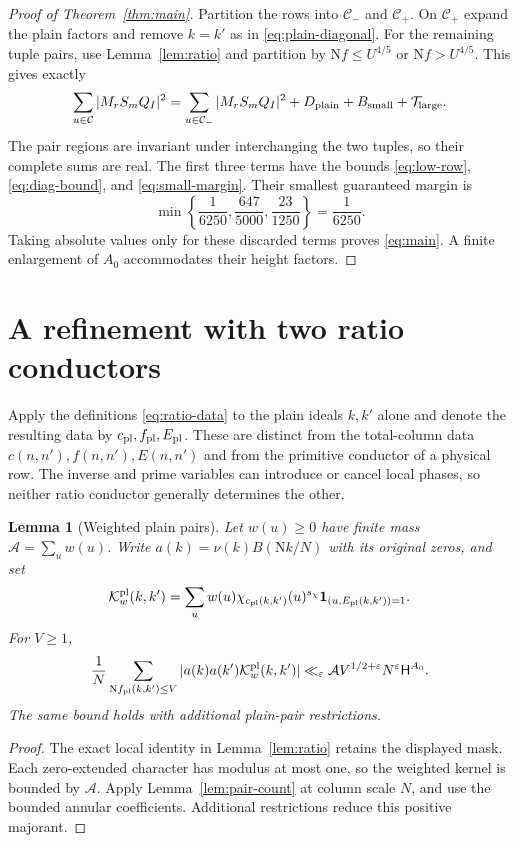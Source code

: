 \documentclass[11pt]{article}
\newtheorem{lemma}[theorem]{Lemma}
\theoremstyle{definition}
\theoremstyle{remark}
\numberwithin{equation}{section}
\newcommand{\Nm}{\mathrm N}
\newcommand{\CC}{\mathcal C}
\newcommand{\HH}{\mathsf H}
\newcommand{\ind}{\mathbf1}
\newcommand{\ee}{\varepsilon}
\newcommand{\Tlarge}{\mathcal T_{\mathrm{large}}}
\begin{document}
\begin{proof}[Proof of Theorem~\ref{thm:main}]
Partition the rows into $\CC_-$ and $\CC_+$. On $\CC_+$ expand the
plain factors and remove $k=k'$ as in \eqref{eq:plain-diagonal}.
For the remaining tuple pairs, use Lemma~\ref{lem:ratio} and partition
by $\Nm f\le U^{4/5}$ or $\Nm f>U^{4/5}$. This gives exactly
\[
\sum_{u\in\CC}|M_rS_mQ_I|^2
=\sum_{u\in\CC_-}|M_rS_mQ_I|^2
+D_{\rm plain}+B_{\rm small}+\Tlarge.
\]
The pair regions are invariant under interchanging the two tuples,
so their complete sums are real. The first three terms have the
bounds \eqref{eq:low-row}, \eqref{eq:diag-bound}, and
\eqref{eq:small-margin}. Their smallest guaranteed margin is
\[
\min\left\{\frac1{6250},\frac{647}{5000},\frac{23}{1250}\right\}
=\frac1{6250}.
\]
Taking absolute values only for these discarded terms proves
\eqref{eq:main}. A finite enlargement of $A_0$ accommodates their
height factors.
\end{proof}

\section{A refinement with two ratio conductors}\label{sec:two-ratios}

Apply the definitions \eqref{eq:ratio-data} to the plain ideals $k,k'$
alone and denote the resulting data by
$c_{\rm pl},f_{\rm pl},E_{\rm pl}$. These are distinct from the
total-column data $c(n,n'),f(n,n'),E(n,n')$ and from the primitive
conductor of a physical row. The inverse and prime variables can
introduce or cancel local phases, so neither ratio conductor generally
determines the other.

\begin{lemma}[Weighted plain pairs]\label{lem:weighted-plain}
Let $w(u)\ge0$ have finite mass $\mathcal A=\sum_u w(u)$.
Write $a(k)=\nu(k)B(\Nm k/N)$ with its original zeros, and set
\[
\mathcal K_w^{\rm pl}(k,k')=
 \sum_u w(u)\chi_{c_{\rm pl}(k,k')}(u)^{s_\chi}
 \ind_{(u,E_{\rm pl}(k,k'))=1}.
\]
For $V\ge1$,
\begin{equation}\label{eq:weighted-plain}
\frac1N\sum_{\Nm f_{\rm pl}(k,k')\le V}
 |a(k)a(k')\mathcal K_w^{\rm pl}(k,k')|
\ll_\ee \mathcal A V^{1/2+\ee}N^\ee\HH^{A_0}.
\end{equation}
The same bound holds with additional plain-pair restrictions.
\end{lemma}
\begin{proof}
The exact local identity in Lemma~\ref{lem:ratio} retains the displayed
mask. Each zero-extended character has modulus at most one, so the
weighted kernel is bounded by $\mathcal A$. Apply
Lemma~\ref{lem:pair-count} at column scale $N$, and use the bounded
annular coefficients. Additional restrictions reduce this positive
majorant.
\end{proof}
\end{document}
